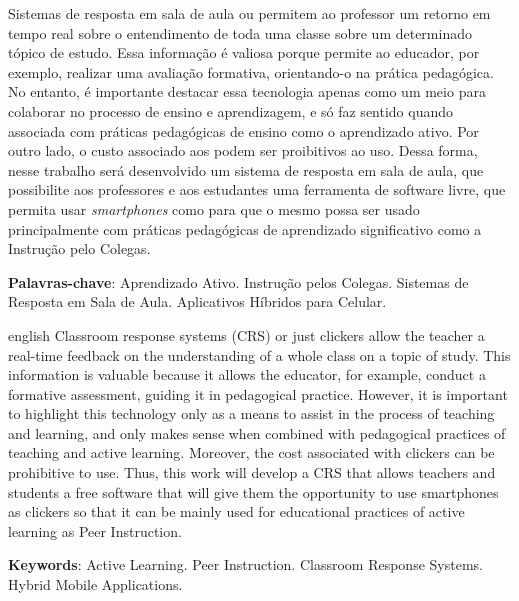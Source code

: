 \setlength{\absparsep}{18pt} %
\begin{resumo}
  Sistemas de resposta em sala de aula ou {\clickers} permitem ao professor um retorno
  em tempo real sobre o entendimento de toda uma classe sobre um determinado
  tópico de estudo. Essa informação é valiosa porque permite ao educador, por exemplo,
  realizar uma avaliação formativa, orientando-o na prática pedagógica. No entanto,
  é importante destacar essa tecnologia apenas como um meio para colaborar no processo
  de ensino e aprendizagem, e só faz sentido quando associada com práticas
  pedagógicas de ensino como o aprendizado ativo. Por outro lado, o custo associado
  aos {\clickers} podem ser proibitivos ao uso. Dessa forma, nesse trabalho será
  desenvolvido um sistema de resposta em sala de aula, que possibilite aos
  professores e aos estudantes uma ferramenta de software livre, que permita
  usar \textit{smartphones} como {\clickers} para que o mesmo possa ser usado
  principalmente com práticas pedagógicas de aprendizado significativo como a Instrução pelo Colegas.

 \textbf{Palavras-chave}:  Aprendizado Ativo. Instrução pelos Colegas. Sistemas de Resposta em Sala de Aula. Aplicativos Híbridos para Celular.
\end{resumo}

\begin{resumo}[Abstract]
 \begin{otherlanguage*}{english}
   Classroom response systems (CRS) or just clickers allow the teacher a real-time feedback on the understanding of a whole class on a topic of study. This information is valuable because it allows the educator, for example, conduct a formative assessment, guiding it in pedagogical practice.
   However, it is important to highlight this technology only as a means to assist in the process of teaching and learning, and only makes sense when combined with pedagogical practices of teaching and active learning. Moreover, the cost associated with clickers can be prohibitive to use. Thus, this work will develop a CRS that allows teachers and students a free software that will give them the opportunity to use smartphones as clickers so that it can be mainly used for educational practices of active learning as Peer Instruction.

   \noindent
   \textbf{Keywords}: Active Learning. Peer Instruction. Classroom Response Systems. Hybrid Mobile Applications.
 \end{otherlanguage*}
\end{resumo}

